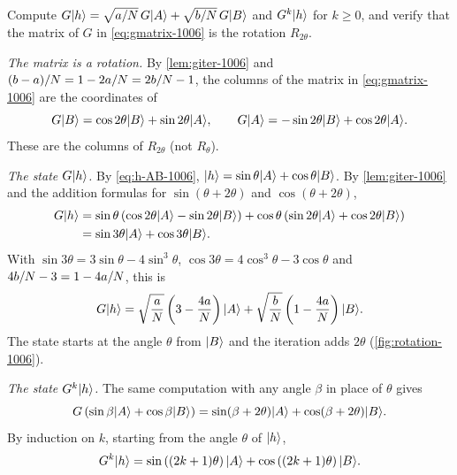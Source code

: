 \begin{exercisebox}
\begin{exercise}\label{ex:grover-rotation-1006}
    Compute $G\lvert h \rangle = \sqrt{a/N}\, G\lvert A \rangle + \sqrt{b/N}\, G\lvert B \rangle$ and
    $G^k\lvert h \rangle$ for $k \geq 0$, and verify that the matrix of $G$ in \cref{eq:gmatrix-1006} is the
    rotation $R_{2\theta}$.
\end{exercise}
\tcblower
\begin{wsolution}
    \emph{The matrix is a rotation.} By \cref{lem:giter-1006} and
    $(b-a)/N = 1 - 2a/N = 2b/N - 1$, the columns of the matrix in
    \cref{eq:gmatrix-1006} are the coordinates of
    \[G\lvert B \rangle = \cos 2\theta \lvert B \rangle + \sin 2\theta \lvert A \rangle, \qquad
        G\lvert A \rangle = -\sin 2\theta \lvert B \rangle + \cos 2\theta \lvert A \rangle.\]
    These are the columns of $R_{2\theta}$ (not $R_\theta$).

    \emph{The state $G\lvert h \rangle$.} By \cref{eq:h-AB-1006}, $\lvert h \rangle = \sin\theta \lvert A \rangle + \cos\theta \lvert B \rangle$.
    By \cref{lem:giter-1006} and the addition formulas for $\sin(\theta + 2\theta)$ and
    $\cos(\theta + 2\theta)$,
    \begin{align*}
        G\lvert h \rangle
         & = \sin\theta \left(\cos 2\theta \lvert A \rangle - \sin 2\theta \lvert B \rangle\right) + \cos\theta \left(\sin 2\theta \lvert A \rangle + \cos 2\theta \lvert B \rangle\right) \\
         & = \sin 3\theta \lvert A \rangle + \cos 3\theta \lvert B \rangle.
    \end{align*}
    With $\sin 3\theta = 3\sin\theta - 4\sin^3\theta$, $\cos 3\theta = 4\cos^3\theta - 3\cos\theta$ and
    $4b/N - 3 = 1 - 4a/N$, this is
    \[G\lvert h \rangle = \sqrt{\frac{a}{N}}\left(3 - \frac{4a}{N}\right)\lvert A \rangle + \sqrt{\frac{b}{N}}\left(1 - \frac{4a}{N}\right)\lvert B \rangle.\]
    The state starts at the angle $\theta$ from $\lvert B \rangle$ and the iteration adds $2\theta$
    (\cref{fig:rotation-1006}).

    \emph{The state $G^k\lvert h \rangle$.} The same computation with any angle $\beta$ in place of $\theta$ gives
    \[G\left(\sin\beta \lvert A \rangle + \cos\beta \lvert B \rangle\right) = \sin(\beta + 2\theta) \lvert A \rangle + \cos(\beta + 2\theta) \lvert B \rangle.\]
    By induction on $k$, starting from the angle $\theta$ of $\lvert h \rangle$,
    \[G^k\lvert h \rangle = \sin\left((2k+1)\theta\right) \lvert A \rangle + \cos\left((2k+1)\theta\right) \lvert B \rangle.\]
\end{wsolution}
\end{exercisebox}

